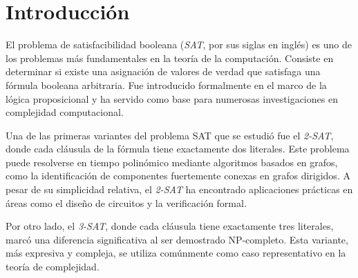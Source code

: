 \chapter{Introducción}

El problema de satisfacibilidad booleana (\textit{SAT}, por sus siglas en inglés)
es uno de los problemas más fundamentales en la teoría de la computación.
Consiste en determinar si existe una asignación de valores de verdad que satisfaga una fórmula booleana arbitraria.
Fue introducido formalmente en el marco de la lógica proposicional y ha servido como base para numerosas investigaciones
en complejidad computacional.

Una de las primeras variantes del problema SAT que se estudió fue el \textit{2-SAT}, donde cada cláusula de la fórmula
tiene exactamente dos literales. Este problema puede resolverse en tiempo polinómico mediante algoritmos basados en grafos,
como la identificación de componentes fuertemente conexas en grafos dirigidos. A pesar de su simplicidad relativa,
el \textit{2-SAT} ha encontrado aplicaciones prácticas en áreas como el diseño de circuitos y la verificación formal.

Por otro lado, el \textit{3-SAT}, donde cada cláusula tiene exactamente tres literales,
marcó una diferencia significativa al ser demostrado NP-completo. Esta variante, más expresiva y compleja,
se utiliza comúnmente como caso representativo en la teoría de complejidad.

